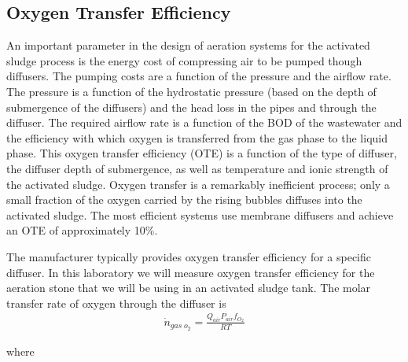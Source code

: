 \documentclass[letterpaper,10pt,english]{sphinxmanual}
\begin{document}
\subsection{Oxygen Transfer Efficiency}
\label{\detokenize{Gas_Transfer/Gas_Transfer:oxygen-transfer-efficiency}}\label{\detokenize{Gas_Transfer/Gas_Transfer:heading-gas-transfer-oxygen-transfer-efficiency}}
An important parameter in the design of aeration systems for the activated sludge process is the energy cost of compressing air to be pumped though diffusers. The pumping costs are a function of the pressure and the airflow rate. The pressure is a function of the hydrostatic pressure (based on the depth of submergence of the diffusers) and the head loss in the pipes and through the diffuser. The required airflow rate is a function of the BOD of the wastewater and the efficiency with which oxygen is transferred from the gas phase to the liquid phase. This oxygen transfer efficiency (OTE) is a function of the type of diffuser, the diffuser depth of submergence, as well as temperature and ionic strength of the activated sludge. Oxygen transfer is a remarkably inefficient process; only a small fraction of the oxygen carried by the rising bubbles diffuses into the activated sludge. The most efficient systems use membrane diffusers and achieve an OTE of approximately 10\%.

The manufacturer typically provides oxygen transfer efficiency for a specific diffuser. In this laboratory we will measure oxygen transfer efficiency for the aeration stone that we will be using in an activated sludge tank. The molar transfer rate of oxygen through the diffuser is
\begin{equation}\label{equation:Gas_Transfer/Gas_Transfer:eq_Gas_air_supply}
\begin{split}\dot{n}_{gas\; o_{2} } =\frac{Q_{air} P_{air} f_{O_{2} } }{RT}\end{split}
\end{equation}\begin{description}
\item[{where}] \leavevmode
{}

\end{description}
\end{document}
